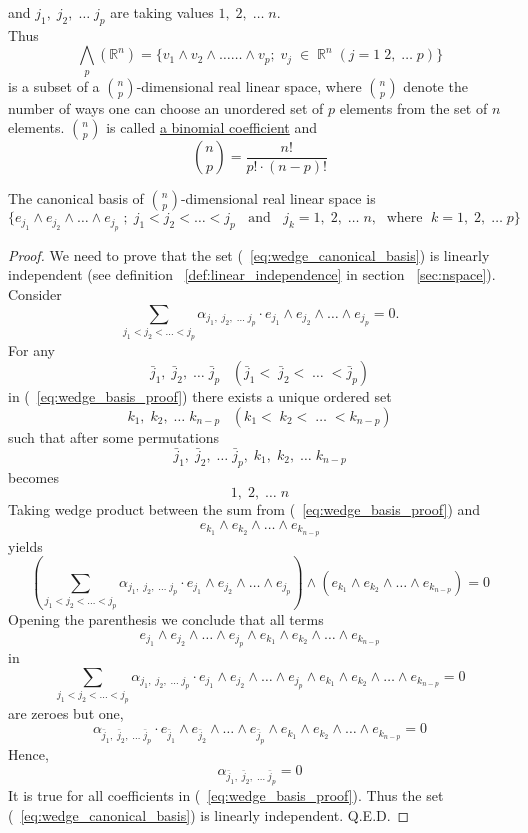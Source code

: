\documentclass[color=black,11pt]{elegantpaper}
\begin{document}
and $j_1,\;j_2,\;\dots\;j_p$ are taking values $1,\;2,\;\dots \;n.$\\
Thus
$$
{\bigwedge}_p (\mathbb{R}^n) = \{ v_1\wedge v_2 \wedge \dots \dots \wedge v_p ;\;v_j\; \in \; \mathbb{R}^n\;(j=1\;2,\; \dots \;p)\} 
$$ 
is a subset of a $\displaystyle{ n \choose p}$-dimensional real linear space, where $\displaystyle{ n \choose p}$ denote the number of ways one can choose an unordered set of $p$ elements from the set of $n$ elements. \href{https://en.wikipedia.org/wiki/Binomial_coefficient}{$\displaystyle{ n \choose p}$} is called \href{https://en.wikipedia.org/wiki/Binomial_coefficient}{a binomial coefficient} and
$$
\displaystyle{ n \choose p} = \frac{n!}{p! \cdot (n-p)!}
$$
\begin{theorem}
The canonical basis of $\displaystyle{ n \choose p}$-dimensional real linear space is
\begin{equation}
\label{eq:wedge_canonical_basis}
\{e_{j_1}\wedge e_{j_2} \wedge \dots \wedge e_{j_p}\;;\;j_1<j_2<\dots<j_p\;\;\mbox{ and }\;\;j_k=1,\;2,\;\dots \;n,\;\mbox{ where }\;k=1,\;2,\;\dots \; p\}
\end{equation}
\end{theorem} 
\begin{proof}
We need to prove that the set (~\ref{eq:wedge_canonical_basis}) is linearly independent (see definition ~\ref{def:linear_independence} in section ~\ref{sec:nspace}). Consider
\begin{equation}
\label{eq:wedge_basis_proof}
 \sum_{j_1<j_2<\dots<j_p} \alpha_{j_1,\;j_2,\;\dots\;j_p}\cdot e_{j_1}\wedge e_{j_2} \wedge \dots \wedge e_{j_p}=0.
\end{equation}
For any 
$$
\bar j_1,\;\bar j_2,\;\dots\;\bar j_p\;\;\;(\bar j_1<\;\bar j_2<\;\dots\;< \bar j_p)
$$
 in (~\ref{eq:wedge_basis_proof}) there exists a unique ordered set
$$
k_1,\;k_2,\;\dots\;k_{n-p}  \;\;\; (k_1<\;k_2<\;\dots\;<k_{n-p} )
$$
such that after some permutations
$$
\bar j_1,\;\bar j_2,\;\dots\;\bar j_p,\; k_1,\;k_2,\;\dots\;k_{n-p}
$$ 
becomes
$$
1,\;2,\;\dots\;n
$$
Taking wedge product between the sum from (~\ref{eq:wedge_basis_proof}) and
$$
 e_{k_1}\wedge e_{k_2} \wedge \dots \wedge e_{k_{n-p}}
$$
yields
$$
(\sum_{j_1<j_2<\dots<j_p} \alpha_{j_1,\;j_2,\;\dots\;j_p}\cdot e_{j_1}\wedge e_{j_2} \wedge \dots \wedge e_{j_p})\wedge ( e_{k_1}\wedge e_{k_2} \wedge \dots \wedge e_{k_{n-p}})=0
$$
Opening the parenthesis we conclude that all terms 
$$
e_{j_1}\wedge e_{j_2} \wedge \dots \wedge e_{j_p}\wedge  e_{k_1}\wedge e_{k_2} \wedge \dots \wedge e_{k_{n-p}}
$$
in 
$$
\sum_{j_1<j_2<\dots<j_p} \alpha_{j_1,\;j_2,\;\dots\;j_p}\cdot e_{j_1}\wedge e_{j_2} \wedge \dots \wedge e_{j_p}\wedge  e_{k_1}\wedge e_{k_2} \wedge \dots \wedge e_{k_{n-p}}=0
$$
 are zeroes but one,
$$
\alpha_{\bar j_1,\;\bar j_2,\;\dots\;\bar j_p}\cdot  e_{\bar j_1}\wedge e_{\bar j_2} \wedge \dots \wedge e_{\bar j_p}\wedge  e_{k_1}\wedge e_{k_2} \wedge \dots \wedge e_{k_{n-p}}=0
$$
Hence,
$$
\alpha_{\bar j_1,\;\bar j_2,\;\dots\;\bar j_p} =0
$$
It is true for all coefficients in (~\ref{eq:wedge_basis_proof}).
Thus the set (~\ref{eq:wedge_canonical_basis}) is linearly independent. 
\vspace{0.1cm}
Q.E.D.
\vspace{0.1cm}
\end{proof} 
\end{document}
